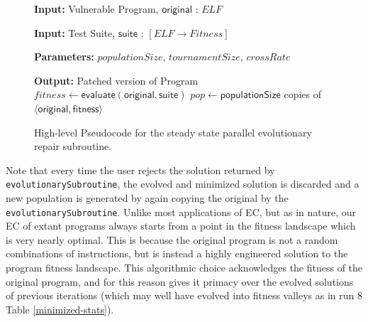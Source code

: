 \documentclass{sigcomm-alternate}
\begin{document}
\begin{figure}[htb]
\begin{algorithmic}[1]
\small
\item[{\textbf{Input: }} {Vulnerable Program, $\mathsf{original}$ : $ELF$}]
\item[{\textbf{Input: }} {Test Suite, $\mathsf{suite}$ : $[ELF \rightarrow Fitness]$}]
\item[{\textbf{Parameters: }} {$populationSize$, $tournamentSize$, $crossRate$}]
\item[{\textbf{Output: }} {Patched version of Program}] 
   $fitness \leftarrow \mathsf{evaluate}(\mathsf{original}, \mathsf{suite})$ 
   $pop \leftarrow \mathsf{populationSize}$ copies of $\langle \mathsf{original}, \mathsf{fitness} \rangle$
\end{algorithmic}
\caption{\label{evolutionary-subroutine}High-level Pseudocode for the
steady state parallel evolutionary repair subroutine.}
\end{figure}

Note that every time the user rejects the
solution returned by \texttt{evolutionarySubroutine}, the evolved and
minimized solution is discarded and a new population is generated by
again copying the original by the \texttt{evolutionarySubroutine}.  Unlike
most applications of EC, but as in nature, our EC of extant programs
always starts from a point in the fitness landscape which is very
nearly optimal.  This is because the original program is not a random
combinations of instructions, but is instead 
a highly engineered solution to the program fitness
landscape.  This algorithmic choice acknowledges the fitness of the
original program, and for this reason gives it primacy over the
evolved solutions of previous iterations (which may well have evolved
into fitness valleys as in run 8 Table \ref{minimized-stats}).
\end{document}
